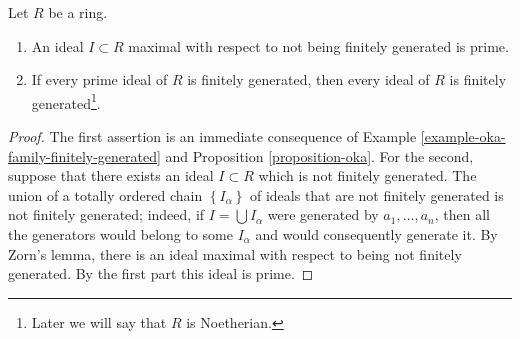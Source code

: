 \begin{lemma}
\label{lemma-cohen}
Let $R$ be a ring.
\begin{enumerate}
\item An ideal $I \subset R$ maximal with respect to not being
finitely generated is prime.
\item If every prime ideal of $R$ is
finitely generated, then
every ideal of $R$ is finitely generated\footnote{Later we will say
that $R$ is Noetherian.}.
\end{enumerate}
\end{lemma}

\begin{proof}
The first assertion is an immediate consequence of
Example \ref{example-oka-family-finitely-generated} and
Proposition \ref{proposition-oka}. For the second,
suppose that there exists an ideal $I \subset R$ which is not finitely
generated. The union of a totally ordered chain $\left\{I_\alpha\right\}$
of ideals that are not finitely generated is not finitely generated;
indeed, if $I = \bigcup I_\alpha$ were generated by
$a_1, \ldots, a_n$, then all the generators would belong to some
$I_\alpha $ and would consequently generate it.
By Zorn's lemma, there is an ideal maximal with respect to being not finitely
generated. By the first part this ideal is prime.
\end{proof}
